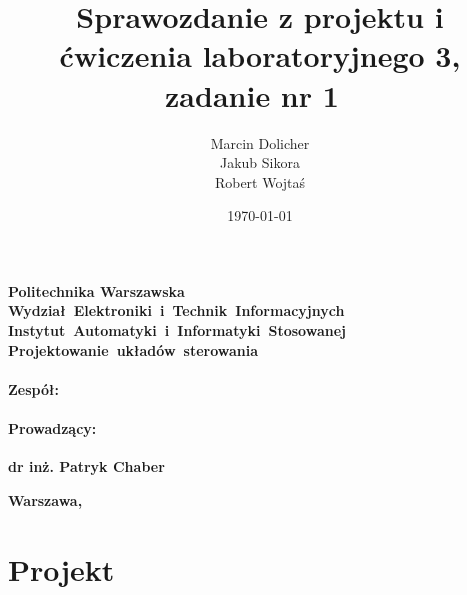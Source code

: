 \documentclass{mwrep}
\title{\bf Sprawozdanie z projektu i ćwiczenia laboratoryjnego 3, zadanie nr 1 \vskip 0.1cm}
\author{Marcin Dolicher \\ Jakub Sikora \\ Robert Wojtaś}
\date{\today}
\begin{document}
\makeatletter
\renewcommand{\maketitle}{\begin{titlepage}
		\begin{center}{
				\LARGE {\bf Politechnika Warszawska}}\\
            \vspace{0.4cm}
            \leftskip-0.9cm
            {\LARGE {\bf \mbox{Wydział Elektroniki i Technik Informacyjnych}}}\\
            \vspace{0.2cm}
            {\LARGE {\bf \mbox{Instytut Automatyki i Informatyki Stosowanej}}}\\
            
            \vspace{5cm}
            \leftskip-1.3cm
			{\bf \Huge \mbox{Projektowanie układów sterowania} \vskip 0.1cm}
		\end{center}
		\vspace{0.1cm}

		\begin{center}
			{\bf \LARGE \@title}
		\end{center}

		\vspace{10cm}
		\begin{paracol}{2}
			\addtocontents{toc}{\protect\setcounter{tocdepth}{1}}
			\subsection*{Zespół:}
			\bf{ \Large{ \noindent\@author \par}}
			\addtocontents{toc}{\protect\setcounter{tocdepth}{2}}

			\switchcolumn \addtocontents{toc}{\protect\setcounter{tocdepth}{1}}
			\subsection*{Prowadzący:}
			\bf{\Large{\noindent dr inż. Patryk Chaber}}
			\addtocontents{toc}{\protect\setcounter{tocdepth}{2}}

		\end{paracol}
		\vspace*{\stretch{6}}
		\begin{center}
			\bf{\large{Warszawa, \@date\vskip 0.1cm}}
		\end{center}
	\end{titlepage}
}
\makeatother
\maketitle
\tableofcontents

\part{Projekt}


\end{document}
